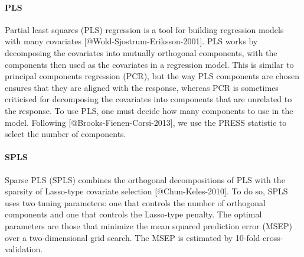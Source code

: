 \paragraph{PLS}\label{pls}

Partial least squares (PLS) regression is a tool for building regression
models with many covariates {[}@Wold-Sjostrum-Eriksson-2001{]}. PLS
works by decomposing the covariates into mutually orthogonal components,
with the components then used as the covariates in a regression model.
This is similar to principal components regression (PCR), but the way
PLS components are chosen ensures that they are aligned with the
response, whereas PCR is sometimes criticised for decomposing the
covariates into components that are unrelated to the response. To use
PLS, one must decide how many components to use in the model. Following
{[}@Brooks-Fienen-Corsi-2013{]}, we use the PRESS statistic to select
the number of components.

\paragraph{SPLS}\label{spls}

Sparse PLS (SPLS) combines the orthogonal decompositions of PLS with the
sparsity of Lasso-type covariate selection {[}@Chun-Keles-2010{]}. To do
so, SPLS uses two tuning parameters: one that controls the number of
orthogonal components and one that controls the Lasso-type penalty. The
optimal parameters are those that minimize the mean squared prediction
error (MSEP) over a two-dimensional grid search. The MSEP is estimated
by 10-fold cross-validation.

